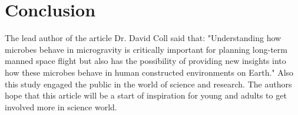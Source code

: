 \documentclass[a4paper, 11pt]{article} %
\begin{document}
\section*{Conclusion}
The lead author of the article Dr. David Coll said that:
 "Understanding how microbes behave in microgravity is critically 
 important for planning long-term manned space flight but also
 has the possibility of providing new insights into how these
 microbes behave in human constructed environments on Earth."
Also this study engaged the public in the world of 
science and research. The authors hope that this article will
 be a start of inspiration for young and adults to get involved 
 more in science world.









\end{document}
